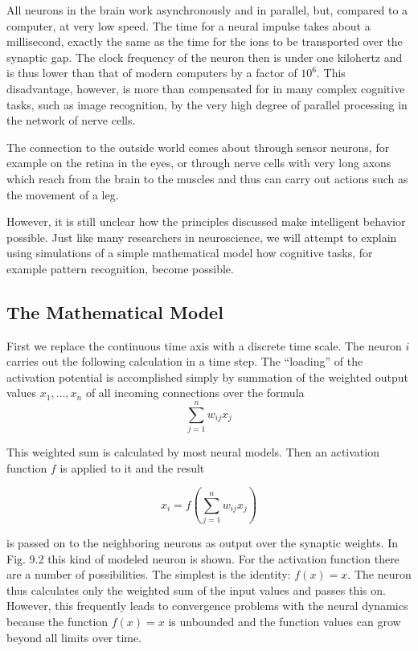 \documentclass[10pt]{book}
\begin{document}
All neurons in the brain work asynchronously and in parallel, but, compared to a computer, at very low speed. The time for a neural impulse takes about a millisecond, exactly the same as the time for the ions to be transported over the synaptic gap. The clock frequency of the neuron then is under one kilohertz and is thus lower than that of modern computers by a factor of $10^{6}$. This disadvantage, however, is more than compensated for in many complex cognitive tasks, such as image recognition, by the very high degree of parallel processing in the network of nerve cells.

The connection to the outside world comes about through sensor neurons, for example on the retina in the eyes, or through nerve cells with very long axons which reach from the brain to the muscles and thus can carry out actions such as the movement of a leg.

However, it is still unclear how the principles discussed make intelligent behavior possible. Just like many researchers in neuroscience, we will attempt to explain using simulations of a simple mathematical model how cognitive tasks, for example pattern recognition, become possible.

\subsection{The Mathematical Model}
First we replace the continuous time axis with a discrete time scale. The neuron $i$ carries out the following calculation in a time step. The ``loading'' of the activation potential is accomplished simply by summation of the weighted output values $x_{1}, \ldots, x_{n}$ of all incoming connections over the formula
$$
\sum_{j=1}^{n} w_{ij} x_{j}
$$

This weighted sum is calculated by most neural models. Then an activation function $f$ is applied to it and the result

$$
x_{i}=f\left(\sum_{j=1}^{n} w_{ij} x_{j}\right)
$$

is passed on to the neighboring neurons as output over the synaptic weights. In Fig. 9.2 this kind of modeled neuron is shown. For the activation function there are a number of possibilities. The simplest is the identity: $f(x)=x$. The neuron thus calculates only the weighted sum of the input values and passes this on. However, this frequently leads to convergence problems with the neural dynamics because the function $f(x)=x$ is unbounded and the function values can grow beyond all limits over time.
\end{document}
